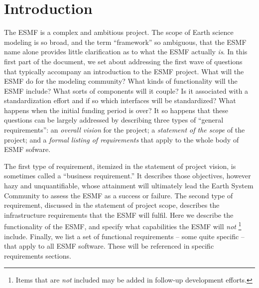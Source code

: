 \section{Introduction}
The ESMF is a complex and ambitious 
project.   The scope of Earth science modeling is so broad, and the 
term ``framework'' so ambiguous, that the ESMF name alone provides 
little clarification as to what the ESMF actually {\it is}.  In 
this first part of the document, we set about addressing the first wave 
of questions that typically accompany an introduction to the ESMF project.  
What will the 
ESMF do for the modeling community?  What kinds of functionality will the ESMF 
include?  What sorts of components will it couple?  Is it associated with 
a standardization effort and if so which interfaces will be 
standardized?  What happens when the initial funding period is over?  
It so happens that these questions can be largely addressed by
describing three types of ``general requirements'': an {\it overall vision}
for the project; a {\it statement of the scope} of the project; and a {\it formal listing of requirements} that apply to the whole body of ESMF sofware.

The first type of requirement, itemized in the statement of project
vision, is sometimes called a ``business requirement.'' \cite{wiegers}
It describes those objectives, however hazy and unquantifiable, whose
attainment will ultimately lead the Earth System Community to assess
the ESMF as a success or failure.  The second type of requirement, 
discussed in the statement of project scope, describes the
infrastructure requirements that the ESMF will fulfil.  Here we
describe the functionality of the ESMF, and specify what capabilities
the ESMF will {\it not} 
\footnote{ Items that are {\it not}
included may be added in follow-up development efforts.}
include.
Finally, we list a set of functional
requirements -- some quite specific -- that apply to all ESMF
software.  These will be referenced in specific requirements 
sections. 





